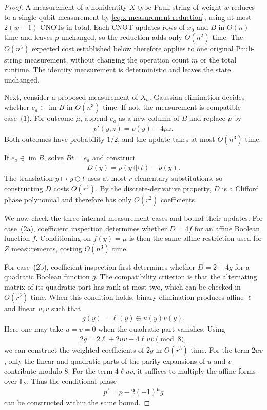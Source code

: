 \begin{proof}
A measurement of a nonidentity $X$-type Pauli string of weight $w$ reduces to a single-qubit measurement by \cref{eq:x-measurement-reduction}, using at most $2(w-1)$ CNOTs in total.
Each CNOT updates rows of $x_0$ and $B$ in $O(n)$ time and leaves $p$ unchanged, so the reduction adds only $O(n^2)$ time.
The $O(n^3)$ expected cost established below therefore applies to one original Pauli-string measurement, without changing the operation count $m$ or the total runtime.
The identity measurement is deterministic and leaves the state unchanged.

Next, consider a proposed measurement of $X_a$.
Gaussian elimination decides whether $e_a\in\operatorname{im}B$ in $O(n^3)$ time.
If not, the measurement is compatible case~(1).
For outcome $\mu$, append $e_a$ as a new column of $B$ and replace $p$ by
\begin{align}
    p'(y,z)=p(y)+4\mu z.
\end{align}
Both outcomes have probability $1/2$, and the update takes at most $O(n^3)$ time.

If $e_a\in\operatorname{im}B$, solve $Bt=e_a$ and construct
\begin{align}
    D(y)=p(y\oplus t)-p(y).
\end{align}
The translation $y\mapsto y\oplus t$ uses at most $r$ elementary substitutions, so constructing $D$ costs $O(r^3)$.
By the discrete-derivative property, $D$ is a Clifford phase polynomial and therefore has only $O(r^2)$ coefficients.

We now check the three internal-measurement cases and bound their updates.
For case~(2a), coefficient inspection determines whether $D=4f$ for an affine Boolean function $f$.
Conditioning on $f(y)=\mu$ is then the same affine restriction used for $Z$ measurements, costing $O(n^3)$ time.

For case~(2b), coefficient inspection first determines whether $D=2+4g$ for a quadratic Boolean function $g$.
The compatibility criterion is that the alternating matrix of its quadratic part has rank at most two, which can be checked in $O(r^3)$ time.
When this condition holds, binary elimination produces affine $\ell$ and linear $u,v$ such that
\begin{align}
    g(y)=\ell(y)\oplus u(y)v(y).
\end{align}
Here one may take $u=v=0$ when the quadratic part vanishes.
Using
\begin{align}
    2g=2\ell+2uv-4\ell uv\pmod 8,
\end{align}
we can construct the weighted coefficients of $2g$ in $O(r^3)$ time.
For the term $2uv$, only the linear and quadratic parts of the parity expansions of $u$ and $v$ contribute modulo $8$.
For the term $4\ell uv$, it suffices to multiply the affine forms over $\mathbb{F}_2$.
Thus the conditional phase
\begin{align}
    p'=p-2(-1)^\mu g
\end{align}
can be constructed within the same bound.


\end{proof}
